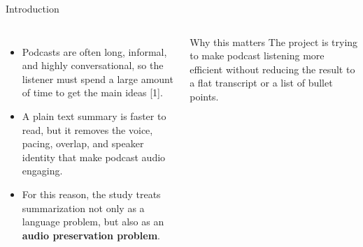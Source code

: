 \documentclass[aspectratio=169,10pt]{beamer}
\newcommand{\framebibtext}{}
\newcommand{\setframebib}[1]{\gdef\framebibtext{#1}}
\newcommand{\refSPORC}{[1] B.~R. Litterer, D.~Jurgens, and D.~Card, ``Mapping the Podcast Ecosystem with the Structured Podcast Research Corpus,'' in \emph{Proc. 63rd Annu. Meeting Assoc. Comput. Linguistics (Vol. 1: Long Papers)}, Vienna, Austria, 2025, pp.~25132--25154, doi: 10.18653/v1/2025.acl-long.1222.}
\begin{document}
\begin{frame}{Introduction}
\setframebib{\refSPORC}
\small
\begin{columns}[T,totalwidth=\textwidth]
\begin{itemize}
  \item Podcasts are often long, informal, and highly conversational, so the listener must spend a large amount of time to get the main ideas [1].
  \item A plain text summary is faster to read, but it removes the voice, pacing, overlap, and speaker identity that make podcast audio engaging.
  \item For this reason, the study treats summarization not only as a language problem, but also as an \textbf{audio preservation problem}.
\end{itemize}

\begin{block}{Why this matters}
The project is trying to make podcast listening more efficient without reducing the result to a flat transcript or a list of bullet points.
\end{block}

\centering
{}
\end{columns}
\end{frame}
\end{document}
